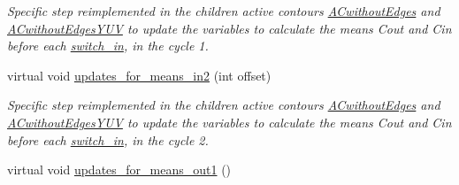 \begin{DoxyCompactItemize}
\begin{DoxyCompactList}\small\item\em Specific step reimplemented in the children active contours \hyperlink{classofeli_1_1_a_cwithout_edges}{A\-Cwithout\-Edges} and \hyperlink{classofeli_1_1_a_cwithout_edges_y_u_v}{A\-Cwithout\-Edges\-Y\-U\-V} to update the variables to calculate the means {\itshape Cout} and {\itshape Cin} before each \hyperlink{classofeli_1_1_active_contour_a7d9a557b580af708155ff4ab8bbfd73b}{switch\-\_\-in}, in the cycle 1. \end{DoxyCompactList}\item 
virtual void \hyperlink{classofeli_1_1_active_contour_a77e9dc7bcbd0ba48499a499891e021cb}{updates\-\_\-for\-\_\-means\-\_\-in2} (int offset)
\begin{DoxyCompactList}\small\item\em Specific step reimplemented in the children active contours \hyperlink{classofeli_1_1_a_cwithout_edges}{A\-Cwithout\-Edges} and \hyperlink{classofeli_1_1_a_cwithout_edges_y_u_v}{A\-Cwithout\-Edges\-Y\-U\-V} to update the variables to calculate the means {\itshape Cout} and {\itshape Cin} before each \hyperlink{classofeli_1_1_active_contour_a7d9a557b580af708155ff4ab8bbfd73b}{switch\-\_\-in}, in the cycle 2. \end{DoxyCompactList}\item 
\hypertarget{classofeli_1_1_active_contour_aa9bc993165ef307dd52eea763eece326}{virtual void \hyperlink{classofeli_1_1_active_contour_aa9bc993165ef307dd52eea763eece326}{updates\-\_\-for\-\_\-means\-\_\-out1} ()}\label{classofeli_1_1_active_contour_aa9bc993165ef307dd52eea763eece326}


\end{DoxyCompactItemize}
